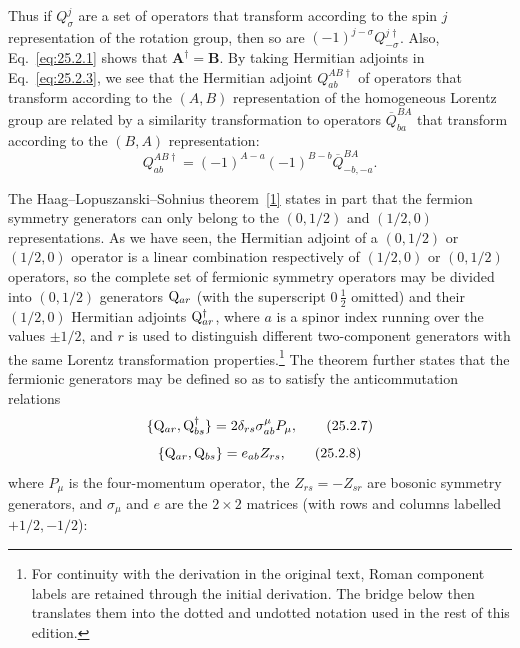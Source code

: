 Thus if \(Q_\sigma^j\) are a set of operators that transform according to
the spin \(j\) representation of the rotation group, then so are
\((-1)^{j-\sigma}Q_{-\sigma}^{j\dagger}\). Also,
Eq.~\eqref{eq:25.2.1} shows that
\(\mathbf A^\dagger=\mathbf B\). By taking Hermitian adjoints in
Eq.~\eqref{eq:25.2.3}, we see that the Hermitian adjoint
\(Q_{ab}^{AB\dagger}\) of operators that transform according to the \((A,B)\)
representation of the homogeneous Lorentz group are related by a similarity
transformation to operators \(\overline Q_{ba}^{BA}\) that transform
according to the \((B,A)\) representation:
\begin{equation}
Q_{ab}^{AB\dagger}
=(-1)^{A-a}(-1)^{B-b}\overline Q_{-b,-a}^{BA}.
\tag{25.2.6}\label{eq:25.2.6}
\end{equation}

The Haag--Lopuszanski--Sohnius theorem~\hyperref[ch25-ref-1]{[1]} states in
part that the fermion symmetry generators can only belong to the
\((0,1/2)\) and \((1/2,0)\) representations. As we have seen, the Hermitian
adjoint of a \((0,1/2)\) or \((1/2,0)\) operator is a linear combination
respectively of \((1/2,0)\) or \((0,1/2)\) operators, so the complete set
of fermionic symmetry operators may be divided into \((0,1/2)\) generators
\(\mathrm{Q}_{ar}\) (with the superscript \(0\,\frac12\) omitted) and their
\((1/2,0)\) Hermitian adjoints \(\mathrm{Q}_{ar}^\dagger\), where \(a\) is a
spinor
index running over the values \(\pm1/2\), and \(r\) is used to distinguish
different two-component generators with the same Lorentz transformation
properties.\footnote{For continuity with the derivation in the original
text, Roman component labels are retained through the initial derivation.
The bridge below then translates them into the dotted and undotted notation
used in the rest of this edition.} The
theorem further states that the fermionic generators may be defined so as
to satisfy the anticommutation relations
\begin{equation}
\{\mathrm{Q}_{ar},\mathrm{Q}_{bs}^\dagger\}
=2\delta_{rs}\sigma^\mu_{ab}P_\mu,
\tag{25.2.7}\label{eq:25.2.7}
\end{equation}
\begin{equation}
\{\mathrm{Q}_{ar},\mathrm{Q}_{bs}\}=e_{ab}Z_{rs},
\tag{25.2.8}\label{eq:25.2.8}
\end{equation}
where \(P_\mu\) is the four-momentum operator, the
\(Z_{rs}=-Z_{sr}\) are bosonic symmetry generators, and \(\sigma_\mu\)
and \(e\) are the \(2\times2\) matrices (with rows and columns labelled
\(+1/2,-1/2\)):
